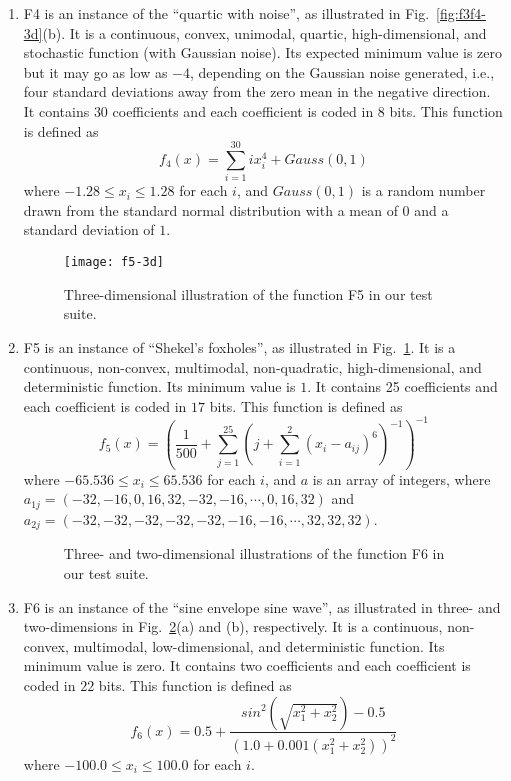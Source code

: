 \documentclass{article}
\begin{document}
\begin{enumerate}
\item F4 is an instance of the “quartic with noise”, as illustrated in
  Fig.~\ref{fig:f3f4-3d}(b). It is a continuous, convex, unimodal,
  quartic, high-dimensional, and stochastic function (with Gaussian
  noise). Its expected minimum value is zero but it may go as low as
  $-4$, depending on the Gaussian noise generated, i.e., four standard
  deviations away from the zero mean in the negative direction. It
  contains $30$ coefficients and each coefficient is coded in $8$
  bits. This function is defined as
\begin{equation}
f_{4}(x)=\sum_{i=1}^{30}ix_{i}^4+Gauss(0,1)
\end{equation}
where $-1.28\leq x_{i}\leq 1.28$ for each $i$, and $Gauss(0, 1)$ is a
random number drawn from the standard normal distribution with a mean
of $0$ and a standard deviation of $1$.

\begin{figure}[ht]
  \centering
  \texttt{[image: f5-3d]}
  \caption{Three-dimensional illustration of the function F5 in our
    test suite.}
  \label{fig:f5-3d}
\end{figure}

\item F5 is an instance of “Shekel’s foxholes”, as illustrated in
  Fig.~\ref{fig:f5-3d}. It is a continuous, non-convex, multimodal,
  non-quadratic, high-dimensional, and deterministic function. Its
  minimum value is $1$. It contains 25 coefficients and each
  coefficient is coded in $17$ bits. This function is defined as
\begin{equation}
f_{5}(x)=(\frac{1}{500}+\sum_{j=1}^{25}(j+\sum_{i=1}^2(x_{i}-a_{ij})^6)^{-1})^{-1}
\end{equation}
where $-65.536\leq x_{i}\leq 65.536$ for each $i$, and $a$ is an array
of integers, where $a_{1j}=(-32,-16,0,16,32,-32,-16,\cdots,0,16,32)$
and $a_{2j}=(-32,-32,-32,-32,-32,-16,-16,\cdots,32,32,32)$.

\begin{figure}[ht]
  \centering
  \subfloat[3d]{{\texttt{[image: f6-3d]}}}
  \qquad
  \subfloat[2d]{{\texttt{[image: f6-2d]}}}  
  \caption{Three- and two-dimensional illustrations of the function F6
    in our test suite.}
  \label{fig:f6-3d}
\end{figure}

\item F6 is an instance of the “sine envelope sine wave”, as
  illustrated in three- and two-dimensions in Fig.~\ref{fig:f6-3d}(a)
  and (b), respectively. It is a continuous, non-convex, multimodal,
  low-dimensional, and deterministic function. Its minimum value is
  zero. It contains two coefficients and each coefficient is coded in
  $22$ bits. This function is defined as
\begin{equation}
f_{6}(x)=0.5+\frac{sin^{2}(\sqrt{x_{1}^{2}+x_{2}^{2}})-0.5}{(1.0+0.001(x_{1}^{2}+x_{2}^{2}))^{2}}
\end{equation}
where $-100.0\leq x_{i}\leq 100.0$ for each $i$.


\end{enumerate}
\end{document}
